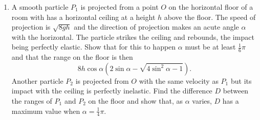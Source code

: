 \documentclass[a4, 11pt]{report}
\newlength{\qspace}
\newcounter{qnumber}
\newenvironment{question}%
 {\vspace{\qspace}
  \begin{enumerate}[\bfseries 1\quad][10]%
    \setcounter{enumi}{\value{qnumber}}%
    \item%
 }
{
  \end{enumerate}
  \filbreak
  \stepcounter{qnumber}
 }
\begin{document}

\begin{question}
A smooth particle $P_{1}$ is projected from a point $O$ on the horizontal
floor of a room with has a horizontal ceiling at a height $h$ above
the floor. The speed of projection is $\sqrt{8gh}$ and the direction
of projection makes an acute angle $\alpha$ with the horizontal.
The particle strikes the ceiling and rebounds, the impact being perfectly
elastic. Show that for this to happen $\alpha$ must be at least $\frac{1}{6}\pi$
and that the range on the floor is then 
\[
8h\cos\alpha\left(2\sin\alpha-\sqrt{4\sin^{2}\alpha-1}\right).
\]
Another particle $P_{2}$ is projected from $O$ with the same velocity
as $P_{1}$ but its impact with the ceiling is perfectly inelastic.
Find the difference $D$ between the ranges of $P_{1}$ and $P_{2}$
on the floor and show that, as $\alpha$ varies, $D$ has a maximum
value when $\alpha=\frac{1}{4}\pi.$ 
\end{question}
	
\end{document}
